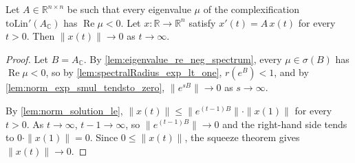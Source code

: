\begin{theorem}[Asymptotic stability of $x' = Ax$]
    \label{thm:linear_ode_asymptotic_stability}
    \leanok
    Let $A \in \mathbb{R}^{n \times n}$ be such that every eigenvalue $\mu$ of the
    complexification $\mathrm{toLin}'(A_{\mathbb{C}})$ has $\operatorname{Re}\mu <
    0$. Let $x \colon \mathbb{R} \to \mathbb{R}^{n}$ satisfy $x'(t) = A\,x(t)$ for
    every $t > 0$. Then $\|x(t)\| \to 0$ as $t \to \infty$.
\end{theorem}
\begin{proof}
    Let $B = A_{\mathbb{C}}$. By \cref{lem:eigenvalue_re_neg_spectrum}, every
    $\mu \in \sigma(B)$ has $\operatorname{Re}\mu < 0$, so by
    \cref{lem:spectralRadius_exp_lt_one}, $r(e^{B}) < 1$, and by
    \cref{lem:norm_exp_smul_tendsto_zero}, $\|e^{sB}\| \to 0$ as $s \to \infty$.

    By \cref{lem:norm_solution_le}, $\|x(t)\| \le \|e^{(t-1)B}\| \cdot \|x(1)\|$
    for every $t > 0$. As $t \to \infty$, $t - 1 \to \infty$, so $\|e^{(t-1)B}\|
    \to 0$ and the right-hand side tends to $0 \cdot \|x(1)\| = 0$. Since $0 \le
    \|x(t)\|$, the squeeze theorem gives $\|x(t)\| \to 0$.
\end{proof}


